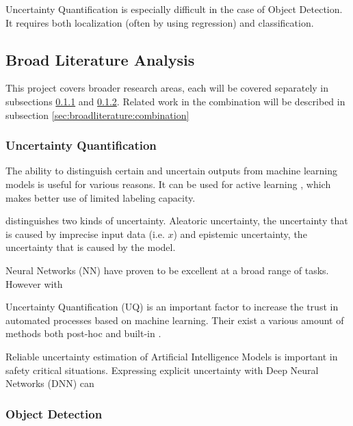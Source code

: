 Uncertainty Quantification is especially difficult in the case of Object Detection. It requires both localization (often by using regression) and classification.

\subsection{Broad Literature Analysis}\label{sec:broadliterature}

This project covers broader research areas, each will be covered separately in subsections \ref{sec:broadliterature:uncertainty} and \ref{sec:broadliterature:object_detection}. Related work in the combination will be described in subsection \ref{sec:broadliterature:combination}

\subsubsection{Uncertainty Quantification}\label{sec:broadliterature:uncertainty}
The ability to distinguish certain and uncertain outputs from machine learning models is useful for various reasons. It can be used for active learning \cite{yang2009effective, settles2009active, Bernhardt_2022}, which makes better use of limited labeling capacity.

\citep{gal2016uncertainty} distinguishes two kinds of uncertainty. Aleatoric uncertainty, the uncertainty that is caused by imprecise input data (i.e. $x$) and epistemic uncertainty, the uncertainty that is caused by the model.

Neural Networks (NN) have proven to be excellent at a broad range of tasks. However with

Uncertainty Quantification (UQ) is an important factor to increase the trust in automated processes based on machine learning. Their exist a various amount of methods both post-hoc  and built-in .



Reliable uncertainty estimation of Artificial Intelligence Models is important in safety critical situations. Expressing explicit uncertainty with Deep Neural Networks (DNN) can

\subsubsection{Object Detection}\label{sec:broadliterature:object_detection}


